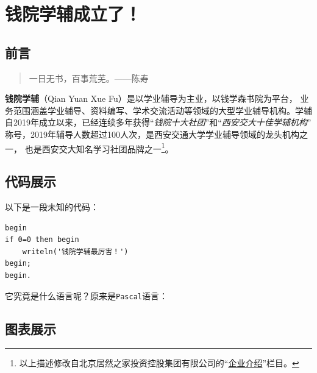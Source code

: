 \hypertarget{ux94b1ux9662ux5b66ux8f85ux6210ux7acbux4e86}{%
\section{钱院学辅成立了！}\label{ux94b1ux9662ux5b66ux8f85ux6210ux7acbux4e86}}

\hypertarget{ux524dux8a00}{%
\subsection{前言}\label{ux524dux8a00}}

\begin{quote}
一日无书，百事荒芜。------陈寿
\end{quote}

\textbf{钱院学辅}（Qian Yuan Xue
Fu）是以学业辅导为主业，以钱学森书院为平台，
业务范围涵盖学业辅导、资料编写、学术交流活动等领域的大型学业辅导机构。学辅
自2019年成立以来，已经连续多年获得``\emph{钱院十大社团}''和``\emph{西安交大十佳学辅机构}''
称号，2019年辅导人数超过100人次，是西安交通大学学业辅导领域的龙头机构之一，
也是西安交大知名学习社团品牌之一\footnote{以上描述修改自北京居然之家投资控股集团有限公司的``\href{http://www.juran.com.cn/node/111}{企业介绍}''栏目。}。

\hypertarget{ux4ee3ux7801ux5c55ux793a}{%
\subsection{代码展示}\label{ux4ee3ux7801ux5c55ux793a}}

以下是一段未知的代码：

\begin{verbatim}
begin
if 0=0 then begin
    writeln('钱院学辅最厉害！')
begin;
begin.
\end{verbatim}

它究竟是什么语言呢？原来是\texttt{Pascal}语言：

\begin{Shaded}
\begin{Highlighting}[]
 \NormalTok{=}  
\NormalTok{)}
\end{Highlighting}
\end{Shaded}

\hypertarget{ux56feux8868ux5c55ux793a}{%
\subsection{图表展示}\label{ux56feux8868ux5c55ux793a}}

